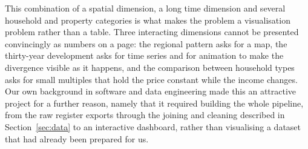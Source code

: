This combination of a spatial dimension, a long time dimension and several
household and property categories is what makes the problem a visualisation
problem rather than a table. Three interacting dimensions cannot be presented
convincingly as numbers on a page: the regional pattern asks for a map, the
thirty-year development asks for time series and for animation to make the
divergence visible as it happens, and the comparison between household types
asks for small multiples that hold the price constant while the income changes.
Our own background in software and data engineering made this an attractive
project for a further reason, namely that it required building the whole
pipeline, from the raw register exports through the joining and cleaning
described in Section~\ref{sec:data} to an interactive dashboard, rather than
visualising a dataset that had already been prepared for us.

